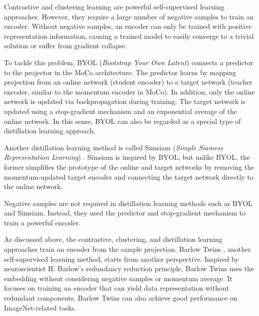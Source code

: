 Contrastive and clustering learning are powerful self-supervised learning approaches. However, they require a large number of negative samples to train an encoder. Without negative samples, an encoder can only be trained with positive representation information, causing a trained model to easily converge to a trivial solution or suffer from gradient collapse. 


To tackle this problem, BYOL (\textit{Bootstrap Your Own Latent}) \cite{BYOL} connects a predictor to the projector in the MoCo architecture. The predictor learns by mapping projection from an online network (student encoder) to a target network (teacher encoder, similar to the momentum encoder in MoCo). In addition, only the online network is updated via backpropagation during training. The target network is updated using a stop-gradient mechanism and an exponential average of the online network. In this sense, BYOL can also be regarded as a special type of distillation learning approach. 


Another distillation learning method is called Simsiam (\textit{Simple Siamese Representation Learning}) \cite{Simsiam}. Simsiam is inspired by BYOL, but unlike BYOL, the former simplifies the prototype of the online and target networks by removing the momentum-updated target encoder and connecting the target network directly to the online network. 


Negative samples are not required in distillation learning methods such as BYOL and Simsiam. Instead, they used the predictor and stop-gradient mechanism to train a powerful encoder.

As discussed above, the contrastive, clustering, and distillation learning approaches train an encoder from the sample projection. Barlow Twins \cite{BarlowTwins}, another self-supervised learning method, starts from another perspective. Inspired by neuroscientist H. Barlow's redundancy reduction principle, Barlow Twins uses the embedding without considering negative samples or momentum average. It focuses on training an encoder that can yield data representation without redundant components. Barlow Twins can also achieve good performance on ImageNet-related tasks.


